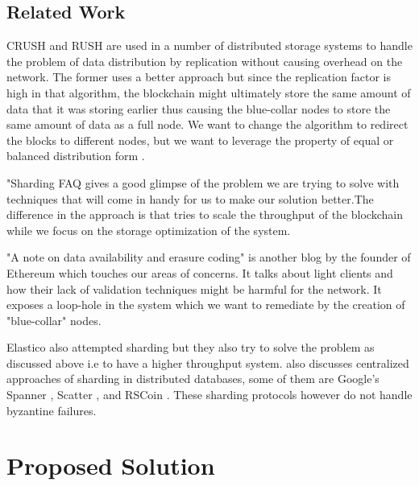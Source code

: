 \documentclass[conference]{IEEEtran}
\begin{document}
\subsection{Related Work}
CRUSH\cite{crush} and RUSH\cite{rush} are used in a number of distributed storage
systems to handle the problem of data distribution by replication without
causing overhead on the network. The former uses a better approach but since the
replication factor is high in that algorithm, the blockchain might ultimately
store the same amount of data that it was storing earlier thus causing the
blue-collar nodes to store the same amount of data as a full node. We want to
change the algorithm to redirect the blocks to different nodes, but we want to
leverage the property of equal or balanced distribution form \cite{crush}.

"Sharding FAQ \cite{sharding} gives a good glimpse of the problem we are trying to
solve with techniques that will come in handy for us to make our solution
better.The difference in the approach is that \cite{sharding} tries to scale the
throughput of the blockchain while we focus on the storage optimization of the
system. 

"A note on data availability and erasure coding" \cite{erasure} is another blog by
the founder of Ethereum \cite{ethY}\cite{ethW} which touches our areas of concerns. It talks
about light clients and how their lack of validation techniques might be harmful
for the network. It exposes a loop-hole in the system which we want to remediate
by the creation of "blue-collar" nodes.

Elastico \cite{elastico} also attempted sharding but they also try to solve the
problem as discussed above i.e to have a higher throughput system.
\cite{elastico} also discusses centralized approaches of sharding in distributed
databases, some of them are Google's Spanner \cite{spanner}, Scatter
\cite{scatter}, and RSCoin \cite{rscoin}. These sharding protocols however do
not handle byzantine failures. 

\section{Proposed Solution}
\end{document}
